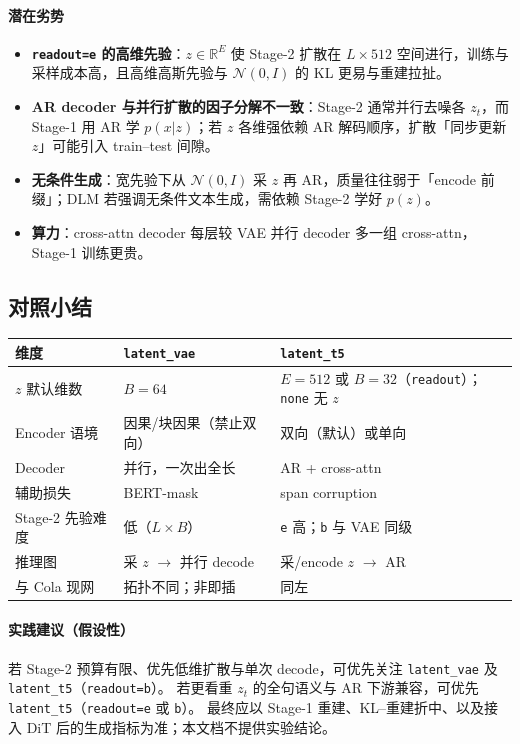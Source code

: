 \documentclass[UTF8,a4paper,11pt]{ctexart}
\begin{document}
\paragraph{潜在劣势}
\begin{itemize}
  \item \textbf{\texttt{readout=e} 的高维先验}：$z\in\mathbb{R}^E$ 使 Stage-2 扩散在 $L{\times}512$ 空间进行，训练与采样成本高，且高维高斯先验与 $\mathcal{N}(0,I)$ 的 KL 更易与重建拉扯。
  \item \textbf{AR decoder 与并行扩散的因子分解不一致}：Stage-2 通常并行去噪各 $z_t$，而 Stage-1 用 AR 学 $p(x|z)$；若 $z$ 各维强依赖 AR 解码顺序，扩散「同步更新 $z$」可能引入 train--test 间隙。
  \item \textbf{无条件生成}：宽先验下从 $\mathcal{N}(0,I)$ 采 $z$ 再 AR，质量往往弱于「encode 前缀」；DLM 若强调无条件文本生成，需依赖 Stage-2 学好 $p(z)$。
  \item \textbf{算力}：cross-attn decoder 每层较 VAE 并行 decoder 多一组 cross-attn，Stage-1 训练更贵。
\end{itemize}

\subsection{对照小结}

\begin{center}
\small
\begin{tabular}{p{2.2cm}p{4.8cm}p{4.8cm}}
\toprule
维度 & \texttt{latent\_vae} & \texttt{latent\_t5} \\
\midrule
$z$ 默认维数 & $B{=}64$ & $E{=}512$ 或 $B{=}32$（\texttt{readout}）；\texttt{none} 无 $z$ \\
Encoder 语境 & 因果/块因果（禁止双向） & 双向（默认）或单向 \\
Decoder & 并行，一次出全长 & AR + cross-attn \\
辅助损失 & BERT-mask & span corruption \\
Stage-2 先验难度 & 低（$L{\times}B$） & \texttt{e} 高；\texttt{b} 与 VAE 同级 \\
推理图 & 采 $z$ $\to$ 并行 decode & 采/encode $z$ $\to$ AR \\
与 Cola 现网 & 拓扑不同；非即插 & 同左 \\
\bottomrule
\end{tabular}
\end{center}

\paragraph{实践建议（假设性）}
若 Stage-2 预算有限、优先低维扩散与单次 decode，可优先关注 \texttt{latent\_vae} 及 \texttt{latent\_t5}（\texttt{readout=b}）。
若更看重 $z_t$ 的全句语义与 AR 下游兼容，可优先 \texttt{latent\_t5}（\texttt{readout=e} 或 \texttt{b}）。
最终应以 Stage-1 重建、KL--重建折中、以及接入 DiT 后的生成指标为准；本文档不提供实验结论。
\end{document}
